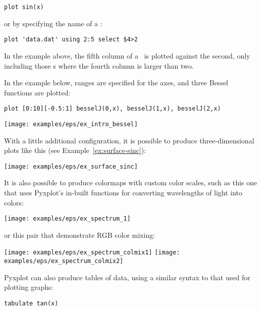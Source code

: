 \begin{verbatim}
plot sin(x)
\end{verbatim}

\noindent or by specifying the name of a \datafile:

\begin{verbatim}
plot 'data.dat' using 2:5 select $4>2
\end{verbatim}

\noindent In the example above, the fifth column of a \datafile\ is plotted
against the second, only including those \datapoint s where the fourth column
is larger than two.

In the example below, ranges are specified for the axes, and three Bessel
functions are plotted:

\begin{verbatim}
plot [0:10][-0.5:1] besselJ(0,x), besselJ(1,x), besselJ(2,x)
\end{verbatim}
\begin{center}
\texttt{[image: examples/eps/ex\_intro\_bessel]}
\end{center}

\noindent With a little additional configuration, it is possible to produce
three-dimensional plots like this (see Example~\ref{ex:surface-sinc}):

\begin{center}
\texttt{[image: examples/eps/ex\_surface\_sinc]}
\end{center}

\noindent It is also possible to produce colormaps with custom color scales,
such as this one that uses Pyxplot's in-built functions for converting
wavelengths of light into colors:

\begin{center}
\texttt{[image: examples/eps/ex\_spectrum\_1]}
\end{center}

\noindent or this pair that demonstrate RGB color mixing:

\begin{center}
\texttt{[image: examples/eps/ex\_spectrum\_colmix1]}
\texttt{[image: examples/eps/ex\_spectrum\_colmix2]}
\end{center}


Pyxplot can also produce tables of data, using a similar syntax to that used
for plotting graphs:

\begin{verbatim}
tabulate tan(x)
\end{verbatim}

